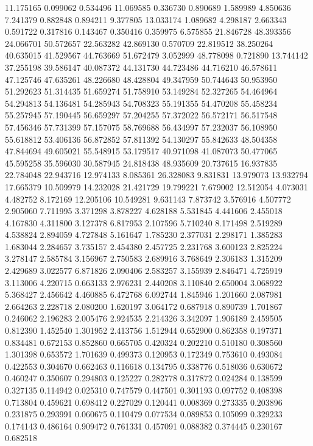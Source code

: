 11.175165
0.099062
0.534496
11.069585
0.336730
0.890689
1.589989
4.850636
7.241379
0.882848
0.894211
9.377805
13.033174
1.089682
4.298187
2.663343
0.591722
0.317816
0.143467
0.350416
0.359975
6.575855
21.846728
48.393356
24.066701
50.572657
22.563282
42.869130
0.570709
22.819512
38.250264
40.635015
41.529567
44.763669
51.672479
3.052999
48.778098
0.721890
13.744142
37.255198
39.586147
40.087372
44.131730
44.723486
44.716210
46.578611
47.125746
47.635261
48.226680
48.428804
49.347959
50.744643
50.953950
51.292623
51.314435
51.659274
51.758910
53.149284
52.327265
54.464964
54.294813
54.136481
54.285943
54.708323
55.191355
54.470208
55.458234
55.257945
57.190445
56.659297
57.204255
57.372022
56.572171
56.517548
57.456346
57.731399
57.157075
58.769688
56.434997
57.232037
56.108950
55.618812
53.406136
56.872852
57.811392
54.130297
55.842633
48.504358
47.844694
49.605021
55.548915
53.179517
40.971098
41.087073
50.477065
45.595258
35.596030
30.587945
24.818438
48.935609
20.737615
16.937835
22.784048
22.943716
12.974133
8.085361
26.328083
9.831831
13.979073
13.932794
17.665379
10.509979
14.232028
21.421729
19.799221
7.679002
12.512054
4.073031
4.482752
8.172169
12.205106
10.549281
9.631143
7.873742
3.576916
4.507772
2.905060
7.711995
3.371298
3.878227
4.628188
5.531845
4.441606
2.455018
4.167830
4.311800
3.127378
6.817953
2.107596
5.710240
8.171498
2.519289
4.538824
2.894059
4.727848
5.161647
1.785230
2.377031
2.298171
1.385283
1.683044
2.284657
3.735157
2.454380
2.457725
2.231768
3.600123
2.825224
3.278147
2.585784
3.156967
2.750583
2.689916
3.768649
2.306183
1.315209
2.429689
3.022577
6.871826
2.090406
2.583257
3.155939
2.846471
4.725919
3.113006
4.220715
0.663133
2.976231
2.440208
3.110840
2.650004
3.068922
5.368427
2.456642
4.460885
6.472768
6.092744
1.845946
1.201660
2.087981
2.664263
2.228718
2.080200
1.620197
3.064172
0.687918
0.890739
1.701867
0.246062
2.196283
2.005476
2.924535
2.214326
3.342097
1.906189
2.459505
0.812390
1.452540
1.301952
2.413756
1.512944
0.652900
0.862358
0.197371
0.834481
0.672153
0.852860
0.665705
0.420324
0.202210
0.510180
0.308560
1.301398
0.653572
1.701639
0.499373
0.120953
0.172349
0.753610
0.493084
0.422553
0.304670
0.662463
0.116618
0.134795
0.338776
0.518036
0.630672
0.460247
0.350607
0.294803
0.125227
0.282778
0.317872
0.024284
0.138599
0.327135
0.114942
0.025310
0.747579
0.447501
0.301193
0.097752
0.408398
0.713804
0.459621
0.698412
0.227029
0.120441
0.008369
0.273335
0.203896
0.231875
0.293991
0.060675
0.110479
0.077534
0.089853
0.105099
0.329233
0.174143
0.486164
0.909472
0.761331
0.457091
0.088382
0.374445
0.230167
0.682518

